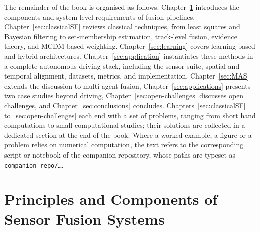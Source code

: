 \documentclass[graybox,envcountchap]{style/SNmono}
\newcommand{\repopath}[1]{\texttt{#1}}
\begin{document}
The remainder of the book is organised as follows. Chapter~\ref{sec:Principles} introduces the components and system-level requirements of fusion pipelines. Chapter~\ref{sec:classicalSF} reviews classical techniques, from least squares and Bayesian filtering to set-membership estimation, track-level fusion, evidence theory, and MCDM-based weighting. Chapter~\ref{sec:learning} covers learning-based and hybrid architectures. Chapter~\ref{sec:application} instantiates these methods in a complete autonomous-driving stack, including the sensor suite, spatial and temporal alignment, datasets, metrics, and implementation. Chapter~\ref{sec:MAS} extends the discussion to multi-agent fusion, Chapter~\ref{sec:applications} presents two case studies beyond driving, Chapter~\ref{sec:open-challenges} discusses open challenges, and Chapter~\ref{sec:conclusions} concludes.
Chapters~\ref{sec:classicalSF} to~\ref{sec:open-challenges} each end with a set of problems, ranging from short hand computations to small computational studies; their solutions are collected in a dedicated section at the end of the book. Where a worked example, a figure or a problem relies on numerical computation, the text refers to the corresponding script or notebook of the companion repository, whose paths are typeset as \repopath{companion\_\allowbreak repo/\allowbreak \ldots}.






\clearpage

\clearpage

\chapter{Principles and Components of Sensor Fusion Systems}
\label{sec:Principles}
\end{document}

